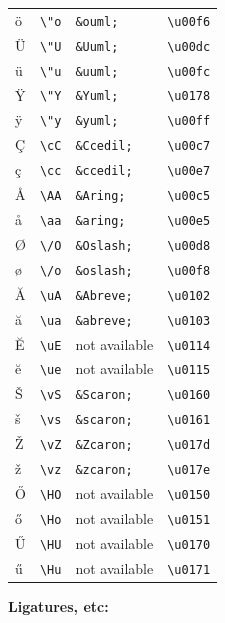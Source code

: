 \documentclass[oneside]{book}
\begin{document}
\begin{longtable}[]{@{}llll@{}}
ö & \texttt{\textbackslash{}"o} & \texttt{\&ouml;} &
\texttt{\textbackslash{}u00f6}\tabularnewline
Ü & \texttt{\textbackslash{}"U} & \texttt{\&Uuml;} &
\texttt{\textbackslash{}u00dc}\tabularnewline
ü & \texttt{\textbackslash{}"u} & \texttt{\&uuml;} &
\texttt{\textbackslash{}u00fc}\tabularnewline
Ÿ & \texttt{\textbackslash{}"Y} & \texttt{\&Yuml;} &
\texttt{\textbackslash{}u0178}\tabularnewline
ÿ & \texttt{\textbackslash{}"y} & \texttt{\&yuml;} &
\texttt{\textbackslash{}u00ff}\tabularnewline
Ç & \texttt{\textbackslash{}cC} & \texttt{\&Ccedil;} &
\texttt{\textbackslash{}u00c7}\tabularnewline
ç & \texttt{\textbackslash{}cc} & \texttt{\&ccedil;} &
\texttt{\textbackslash{}u00e7}\tabularnewline
Å & \texttt{\textbackslash{}AA} & \texttt{\&Aring;} &
\texttt{\textbackslash{}u00c5}\tabularnewline
å & \texttt{\textbackslash{}aa} & \texttt{\&aring;} &
\texttt{\textbackslash{}u00e5}\tabularnewline
Ø & \texttt{\textbackslash{}/O} & \texttt{\&Oslash;} &
\texttt{\textbackslash{}u00d8}\tabularnewline
ø & \texttt{\textbackslash{}/o} & \texttt{\&oslash;} &
\texttt{\textbackslash{}u00f8}\tabularnewline
Ă & \texttt{\textbackslash{}uA} & \texttt{\&Abreve;} &
\texttt{\textbackslash{}u0102}\tabularnewline
ă & \texttt{\textbackslash{}ua} & \texttt{\&abreve;} &
\texttt{\textbackslash{}u0103}\tabularnewline
Ĕ & \texttt{\textbackslash{}uE} & not available &
\texttt{\textbackslash{}u0114}\tabularnewline
ĕ & \texttt{\textbackslash{}ue} & not available &
\texttt{\textbackslash{}u0115}\tabularnewline
Š & \texttt{\textbackslash{}vS} & \texttt{\&Scaron;} &
\texttt{\textbackslash{}u0160}\tabularnewline
š & \texttt{\textbackslash{}vs} & \texttt{\&scaron;} &
\texttt{\textbackslash{}u0161}\tabularnewline
Ž & \texttt{\textbackslash{}vZ} & \texttt{\&Zcaron;} &
\texttt{\textbackslash{}u017d}\tabularnewline
ž & \texttt{\textbackslash{}vz} & \texttt{\&zcaron;} &
\texttt{\textbackslash{}u017e}\tabularnewline
Ő & \texttt{\textbackslash{}HO} & not available &
\texttt{\textbackslash{}u0150}\tabularnewline
ő & \texttt{\textbackslash{}Ho} & not available &
\texttt{\textbackslash{}u0151}\tabularnewline
Ű & \texttt{\textbackslash{}HU} & not available &
\texttt{\textbackslash{}u0170}\tabularnewline
ű & \texttt{\textbackslash{}Hu} & not available &
\texttt{\textbackslash{}u0171}\tabularnewline
\bottomrule
\end{longtable}

\textbf{Ligatures, etc:}
\end{document}
